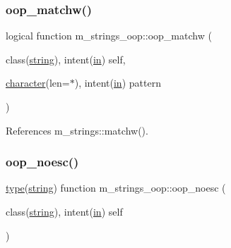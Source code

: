 \subsubsection{\texorpdfstring{oop\+\_\+matchw()}{oop\_matchw()}}
{\footnotesize\ttfamily logical function m\+\_\+strings\+\_\+oop\+::oop\+\_\+matchw (\begin{DoxyParamCaption}\item[{class(\hyperlink{structm__strings__oop_1_1string}{string}), intent(\hyperlink{M__journal_83_8txt_afce72651d1eed785a2132bee863b2f38}{in})}]{self,  }\item[{\hyperlink{option__stopwatch_83_8txt_abd4b21fbbd175834027b5224bfe97e66}{character}(len=$\ast$), intent(\hyperlink{M__journal_83_8txt_afce72651d1eed785a2132bee863b2f38}{in})}]{pattern }\end{DoxyParamCaption})\hspace{0.3cm}{\ttfamily [private]}}



References m\+\_\+strings\+::matchw().

\mbox{\label{namespacem__strings__oop_ae1ed148f1ae0694ac093d3e11f9b702b}} 
\subsubsection{\texorpdfstring{oop\+\_\+noesc()}{oop\_noesc()}}
{\footnotesize\ttfamily \hyperlink{stop__watch_83_8txt_a70f0ead91c32e25323c03265aa302c1c}{type}(\hyperlink{structm__strings__oop_1_1string}{string}) function m\+\_\+strings\+\_\+oop\+::oop\+\_\+noesc (\begin{DoxyParamCaption}\item[{class(\hyperlink{structm__strings__oop_1_1string}{string}), intent(\hyperlink{M__journal_83_8txt_afce72651d1eed785a2132bee863b2f38}{in})}]{self }\end{DoxyParamCaption})\hspace{0.3cm}{\ttfamily [private]}}

\mbox{\label{namespacem__strings__oop_a5959b2f967a6466c198b39a089ef8a68}} 
